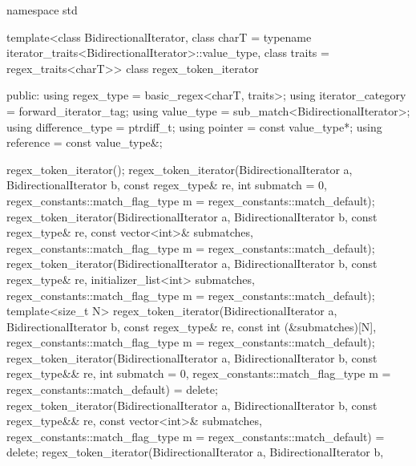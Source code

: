 \begin{codeblock}
namespace std {
  template<class BidirectionalIterator,
            class charT = typename iterator_traits<BidirectionalIterator>::value_type,
            class traits = regex_traits<charT>>
    class regex_token_iterator {
    public:
      using regex_type        = basic_regex<charT, traits>;
      using iterator_category = forward_iterator_tag;
      using value_type        = sub_match<BidirectionalIterator>;
      using difference_type   = ptrdiff_t;
      using pointer           = const value_type*;
      using reference         = const value_type&;

      regex_token_iterator();
      regex_token_iterator(BidirectionalIterator a, BidirectionalIterator b,
                           const regex_type& re,
                           int submatch = 0,
                           regex_constants::match_flag_type m =
                             regex_constants::match_default);
      regex_token_iterator(BidirectionalIterator a, BidirectionalIterator b,
                           const regex_type& re,
                           const vector<int>& submatches,
                           regex_constants::match_flag_type m =
                             regex_constants::match_default);
      regex_token_iterator(BidirectionalIterator a, BidirectionalIterator b,
                           const regex_type& re,
                           initializer_list<int> submatches,
                           regex_constants::match_flag_type m =
                             regex_constants::match_default);
      template<size_t N>
        regex_token_iterator(BidirectionalIterator a, BidirectionalIterator b,
                             const regex_type& re,
                             const int (&submatches)[N],
                             regex_constants::match_flag_type m =
                               regex_constants::match_default);
      regex_token_iterator(BidirectionalIterator a, BidirectionalIterator b,
                           const regex_type&& re,
                           int submatch = 0,
                           regex_constants::match_flag_type m =
                             regex_constants::match_default) = delete;
      regex_token_iterator(BidirectionalIterator a, BidirectionalIterator b,
                           const regex_type&& re,
                           const vector<int>& submatches,
                           regex_constants::match_flag_type m =
                             regex_constants::match_default) = delete;
      regex_token_iterator(BidirectionalIterator a, BidirectionalIterator b,
}}
\end{codeblock}
